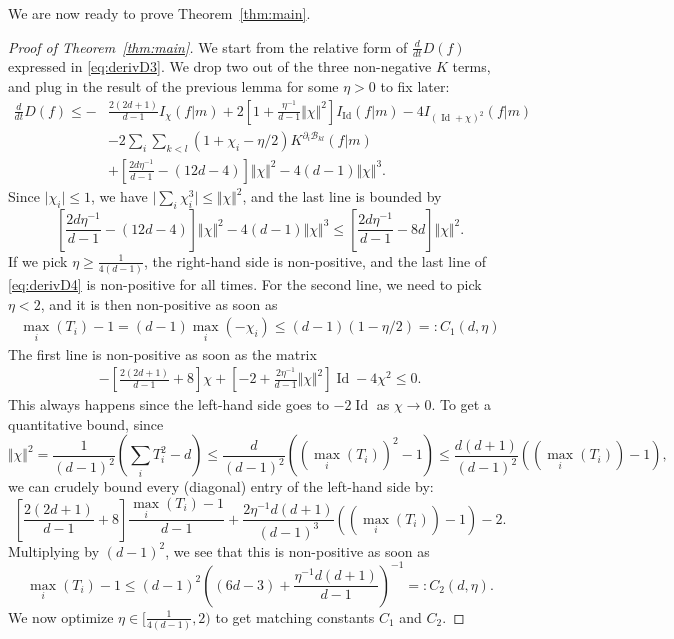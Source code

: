 \documentclass[11pt,a4paper]{article}
\theoremstyle{definition}
\theoremstyle{plain}
\DeclareMathOperator*{\Id}{Id}
\begin{document}
We are now ready to prove Theorem~\ref{thm:main}.
\begin{proof}[Proof of Theorem~\ref{thm:main}]
We start from the relative form of $\frac{d}{dt}D(f)$ expressed in \eqref{eq:derivD3}. We drop two out of the three non-negative $K$ terms, and plug in the result of the previous lemma for some $\eta>0$ to fix later:
\begin{align}
\label{eq:derivD4}
    \frac{d}{dt}D(f)
    \leq-&\frac{2(2d+1)}{d-1}I_\chi(f\vert m)+2\left[1+\frac{\eta^{-1}}{d-1}\Vert \chi\Vert^2\right]I_{\Id}(f\vert m)-4I_{(\Id +\chi)^2}(f\vert m) \\
    &-2\sum_i\sum_{k<l}(1+\chi_i-\eta/2)K^{\partial_i\mathcal{B}_{kl} }(f\vert m)\nonumber\\
    &+\left[\frac{2d\eta^{-1}}{d-1}-(12d-4)\right]\Vert \chi\Vert^2-4(d-1)\Vert \chi\Vert^3\nonumber.
\end{align}
Since $\vert \chi_i\vert\leq 1$, we have $\vert \sum_i \chi_i^3 \vert \leq \Vert \chi\Vert^2$, and the last line is bounded by
$$\left[\frac{2d\eta^{-1}}{d-1}-(12d-4)\right]\Vert \chi\Vert^2-4(d-1)\Vert \chi\Vert^3 \leq \left[\frac{2d\eta^{-1}}{d-1}-8d\right]\Vert \chi\Vert^2.$$
If we pick $\eta\geq \frac{1}{4(d-1)}$, the right-hand side is non-positive, and the last line of \eqref{eq:derivD4} is non-positive for all times. For the second line, we need to pick $\eta<2$, and it is then non-positive as soon as
\begin{align*}
    \max_i(T_i)-1=(d-1)\max_i(-\chi_i)\leq (d-1)(1-\eta /2)=:C_1(d,\eta)
\end{align*}
The first line is non-positive as soon as the matrix
\begin{align*}
    -\left[\frac{2(2d+1)}{d-1}+
    8\right]\chi +\left[-2+\frac{2\eta^{-1}}{d-1}\Vert \chi\Vert^2\right] \Id -4\chi^2\leq 0.
\end{align*}
This always happens since the left-hand side goes to $-2\Id$ as $\chi\rightarrow 0$. To get a quantitative bound, since $$\Vert\chi\Vert^2=\frac{1}{(d-1)^2}\left(\sum_i T_i^2-d\right)\leq \frac{d}{(d-1)^2}\left((\max_i(T_i))^2-1\right)\leq \frac{d(d+1)}{(d-1)^2}\left((\max_i(T_i))-1\right),$$ we can crudely bound every (diagonal) entry of the left-hand side by:
$$ \left[\frac{2(2d+1)}{d-1}+
    8\right]\frac{\max_i(T_i)-1}{d-1} +\frac{2\eta^{-1}d(d+1)}{(d-1)^3}\left( (\max_i(T_i))-1\right)-2.$$
Multiplying by $(d-1)^2$, we see that this is non-positive as soon as
$$\max_i(T_i)-1\leq (d-1)^2\left((6d-3)+\frac{\eta^{-1}d(d+1)}{d-1}\right)^{-1} =:C_2(d,\eta).$$
We now optimize $\eta\in[\frac{1}{4(d-1)},2)$ to get matching constants $C_1$ and $C_2$.

\end{proof}
\end{document}
